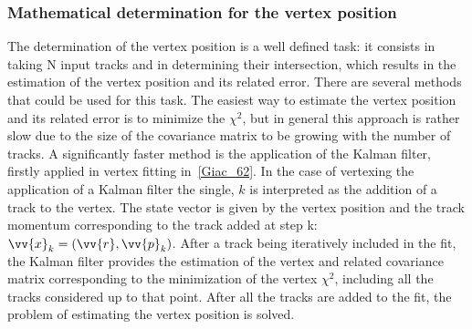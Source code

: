 \subsubsection{Mathematical determination for the vertex position}
\label{sec:kalman_filter}
The determination of the vertex position is a well defined task: it consists in taking N input tracks and in determining their intersection, which results in the estimation of the vertex position and its related error. There are several methods that could be used for this task.
The easiest way to estimate the vertex position and its related error is to minimize the $\chi^2$, but in general this approach is rather slow due to the size of the covariance matrix to be growing with the number of tracks.
A significantly faster method is the application of the Kalman filter, firstly applied in vertex fitting in~\ref{Giac_62}.
In the case of vertexing the application of a Kalman filter the single, $k$ is interpreted as the addition of a track to the vertex. The state vector is given by the vertex position and the track momentum corresponding to the track added at step k: $\vv{x}_k = (\vv{r}, \vv{p}_k)$.
After a track being iteratively included in the fit, the Kalman filter provides the estimation of the vertex and related covariance matrix corresponding to the minimization of the vertex $\chi^2$, including all the tracks considered up to that point. After all the tracks are added to the fit, the problem of estimating the vertex position is solved.

